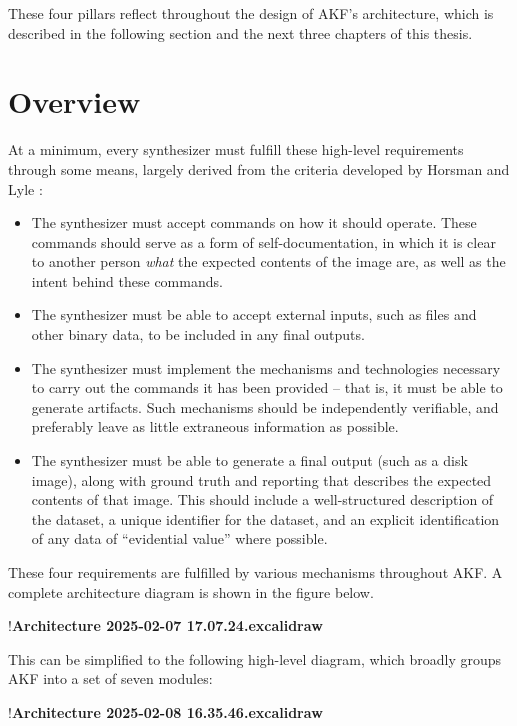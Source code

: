 These four pillars reflect throughout the design of AKF's architecture,
which is described in the following section and the next three chapters
of this thesis.

\section{Overview}\label{overview}

At a minimum, every synthesizer must fulfill these high-level
requirements through some means, largely derived from the criteria
developed by Horsman and Lyle
\cite{horsmanDatasetConstructionChallenges2021}:

\begin{itemize}
\tightlist
\item
  The synthesizer must accept commands on how it should operate. These
  commands should serve as a form of self-documentation, in which it is
  clear to another person \emph{what} the expected contents of the image
  are, as well as the intent behind these commands.
\item
  The synthesizer must be able to accept external inputs, such as files
  and other binary data, to be included in any final outputs.
\item
  The synthesizer must implement the mechanisms and technologies
  necessary to carry out the commands it has been provided -- that is,
  it must be able to generate artifacts. Such mechanisms should be
  independently verifiable, and preferably leave as little extraneous
  information as possible.
\item
  The synthesizer must be able to generate a final output (such as a
  disk image), along with ground truth and reporting that describes the
  expected contents of that image. This should include a well-structured
  description of the dataset, a unique identifier for the dataset, and
  an explicit identification of any data of ``evidential value'' where
  possible.
\end{itemize}

These four requirements are fulfilled by various mechanisms throughout
AKF. A complete architecture diagram is shown in the figure below.

!\textbf{Architecture 2025-02-07 17.07.24.excalidraw}

This can be simplified to the following high-level diagram, which
broadly groups AKF into a set of seven modules:

!\textbf{Architecture 2025-02-08 16.35.46.excalidraw}

